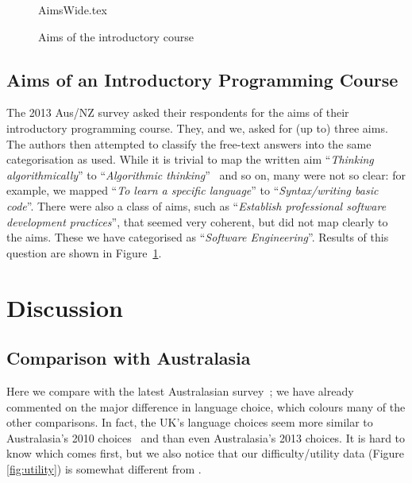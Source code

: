\documentclass[english,submission]{programming}
\begin{document}
\begin{figure}
\begin{center}
{AimsWide.tex}
\end{center}
\caption{Aims of the introductory course\label{fig:aims}}
\end{figure}

\subsection{Aims of an Introductory Programming Course}

The 2013 Aus/NZ survey asked their respondents for the aims of their
introductory programming course. They, and we, asked for (up to) three
aims. The authors then attempted to classify the free-text answers
into the same categorisation as \cite{mason+cooper:2014} used. While
it is trivial to map the written aim ``{\emph{Thinking
algorithmically}}'' to ``{\emph{Algorithmic
thinking}}''~\cite{mason+cooper:2014} and so on, many were not so
clear: for example, we mapped ``{\emph{To learn a specific
language}}'' to ``{\emph{Syntax/writing basic code}}''. There were
also a class of aims, such as ``{\emph{Establish professional software
development practices}}'', that seemed very coherent, but did not map
clearly to the \cite{mason+cooper:2014} aims. These we have
categorised as ``{\emph{Software Engineering}}''. Results of this
question are shown in Figure~\ref{fig:aims}.


\section{Discussion}\label{discussion}

\subsection{Comparison with Australasia}

Here we compare with the latest Australasian
survey~\cite{mason+cooper:2014}; we have already commented on the
major difference in language choice, which colours many of the other
comparisons. In fact, the UK's language choices seem more similar to
Australasia's 2010 choices~\cite{mason-et-al:2012} and \cite[Table
4]{mason+cooper:2014} than even Australasia's 2013 choices. It is hard
to know which comes first, but we also notice that our
difficulty/utility data (Figure \ref{fig:utility}) is somewhat
different from \cite[Figures 7/8]{mason+cooper:2014}.
\end{document}

